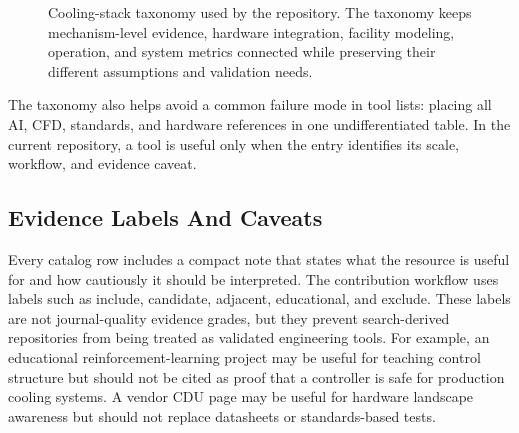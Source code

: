 \documentclass[11pt]{article}
\begin{document}
\begin{figure}[t]
\centering
{}
\caption{Cooling-stack taxonomy used by the repository. The taxonomy keeps mechanism-level evidence, hardware integration, facility modeling, operation, and system metrics connected while preserving their different assumptions and validation needs.}
\label{fig:taxonomy}
\end{figure}

The taxonomy also helps avoid a common failure mode in tool lists: placing all AI, CFD, standards, and hardware references in one undifferentiated table. In the current repository, a tool is useful only when the entry identifies its scale, workflow, and evidence caveat.

\subsection{Evidence Labels And Caveats}

Every catalog row includes a compact note that states what the resource is useful for and how cautiously it should be interpreted. The contribution workflow uses labels such as include, candidate, adjacent, educational, and exclude. These labels are not journal-quality evidence grades, but they prevent search-derived repositories from being treated as validated engineering tools. For example, an educational reinforcement-learning project may be useful for teaching control structure but should not be cited as proof that a controller is safe for production cooling systems. A vendor CDU page may be useful for hardware landscape awareness but should not replace datasheets or standards-based tests.
\end{document}
